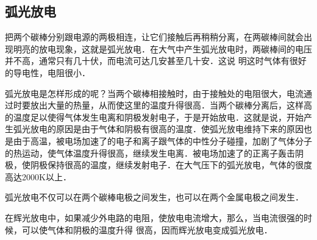 \subsection{弧光放电} 

把两个碳棒分别跟电源的两极相连，让它们接触后再稍稍分离，在两碳棒间就会出现明亮的放电现象，这就是弧光放电．在大气中产生弧光放电时，两碳棒间的电压并不高，通常只有几十伏，而电流可达几安甚至几十安．这说
明这时气体有很好的导电性，电阻很小．

弧光放电是怎样形成的呢？当两个碳棒相接触时，由于接触处的电阻很大，电流通过时要放出大量的热量，从而使这里的温度升得很高．当两个碳棒分离后，这样高的温度足以使得气体发生电离和阴极发射电子，于是开始放电．这就是说，开始产生弧光放电的原因是由于气体和阴极有很高的温度．使弧光放电维持下来的原因也是由于高温，被电场加速了的电子和离子跟气体的中性分子碰撞，加剧了气体分子的热运动，使气体温度升得很高，继续发生电离．被电场加速了的正离子轰击阴极，使阴极保持很高的温度，继续发射电子．在大气压下的弧光放电，气体的很度高达2000K以上．

弧光放电不仅可以在两个碳棒电极之间发生，也可以在两个金属电极之间发生．

在辉光放电中，如果减少外电路的电阻，使放电电流增大，那么，当电流很强的时候，可以使气体和阴极的温度升得
很高，因而辉光放电变成弧光放电．

